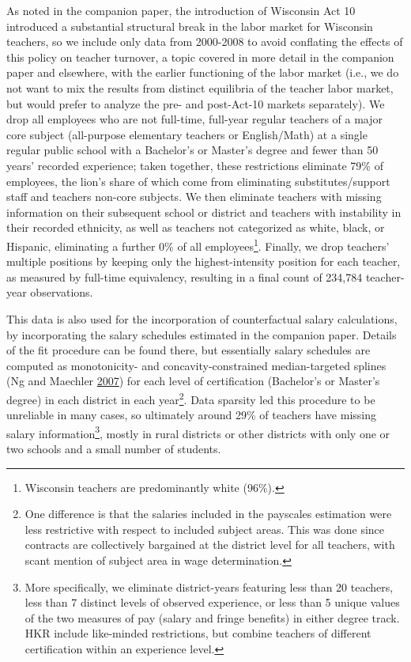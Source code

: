 \documentclass[]{article}
\let\rmarkdownfootnote\footnote%
\def\footnote{\protect\rmarkdownfootnote}
\begin{document}
As noted in the companion paper, the introduction of Wisconsin Act 10
introduced a substantial structural break in the labor market for
Wisconsin teachers, so we include only data from 2000-2008 to avoid
conflating the effects of this policy on teacher turnover, a topic
covered in more detail in the companion paper and elsewhere, with the
earlier functioning of the labor market (i.e., we do not want to mix the
results from distinct equilibria of the teacher labor market, but would
prefer to analyze the pre- and post-Act-10 markets separately). We drop
all employees who are not full-time, full-year regular teachers of a
major core subject (all-purpose elementary teachers or English/Math) at
a single regular public school with a Bachelor's or Master's degree and
fewer than 50 years' recorded experience; taken together, these
restrictions eliminate 79\% of employees, the lion's share of which come
from eliminating substitutes/support staff and teachers non-core
subjects. We then eliminate teachers with missing information on their
subsequent school or district and teachers with instability in their
recorded ethnicity, as well as teachers not categorized as white, black,
or Hispanic, eliminating a further 0\% of all employees\footnote{Wisconsin
  teachers are predominantly white (96\%).}. Finally, we drop teachers'
multiple positions by keeping only the highest-intensity position for
each teacher, as measured by full-time equivalency, resulting in a final
count of 234,784 teacher-year observations.

This data is also used for the incorporation of counterfactual salary
calculations, by incorporating the salary schedules estimated in the
companion paper. Details of the fit procedure can be found there, but
essentially salary schedules are computed as monotonicity- and
concavity-constrained median-targeted splines (Ng and Maechler
\protect\hyperlink{ref-ng}{2007}) for each level of certification
(Bachelor's or Master's degree) in each district in each year\footnote{One
  difference is that the salaries included in the payscales estimation
  were less restrictive with respect to included subject areas. This was
  done since contracts are collectively bargained at the district level
  for all teachers, with scant mention of subject area in wage
  determination.}. Data sparsity led this procedure to be unreliable in
many cases, so ultimately around 29\% of teachers have missing salary
information\footnote{More specifically, we eliminate district-years
  featuring less than 20 teachers, less than 7 distinct levels of
  observed experience, or less than 5 unique values of the two measures
  of pay (salary and fringe benefits) in either degree track. HKR
  include like-minded restrictions, but combine teachers of different
  certification within an experience level.}, mostly in rural districts
or other districts with only one or two schools and a small number of
students.
\end{document}
